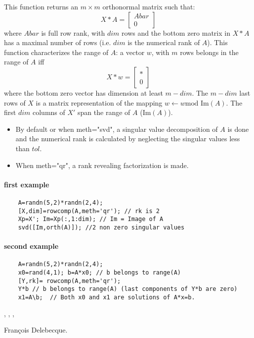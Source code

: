 \begin{mandescription}
This function returns an $m \times m$ orthonormal matrix such that:
$$
  X*A  = \left[ \begin{array}{c} Abar \\ 0 \end{array} \right] 
$$
where $Abar$ is full row rank, with $dim$ rows and the bottom zero matrix
in $X*A$ has a maximal number of rows (i.e. $dim$ is the numerical rank of $A$).
This function characterizes the range of $A$: a vector $w$, with $m$ rows
belongs in the range of $A$ iff 
$$
X*w  = \left[ \begin{array}{c} \ast \\ 0 \end{array} \right]
$$
where the bottom zero vector has dimension at least $m-dim$.
The $m-dim$ last rows of $X$ is a matrix representation of the mapping
$w \leftarrow w \text{mod Im} (A)$. 
The first $dim$ columns of $X'$ span the range of $A$ ($\text{Im}(A)$).
\begin{itemize}
\item By default or when  meth="svd", a singular value decomposition 
of $A$ is done and the numerical rank is calculated by 
neglecting the singular values less than $tol$.
\item When  meth="qr", a rank revealing factorization is made.
\end{itemize}
\end{mandescription}

\begin{examples}
\paragraph{first example}
  \begin{Verbatim}
    A=randn(5,2)*randn(2,4);
    [X,dim]=rowcomp(A,meth='qr'); // rk is 2 
    Xp=X'; Im=Xp(:,1:dim); // Im = Image of A 
    svd([Im,orth(A)]); //2 non zero singular values
  \end{Verbatim}
\paragraph{second example}
  \begin{Verbatim}
    A=randn(5,2)*randn(2,4);
    x0=rand(4,1); b=A*x0; // b belongs to range(A)  
    [Y,rk]= rowcomp(A,meth='qr');
    Y*b // b belongs to range(A) (last components of Y*b are zero)   
    x1=A\b;  // Both x0 and x1 are solutions of A*x=b.
  \end{Verbatim}
\end{examples}

\begin{manseealso}
  , , , 
\end{manseealso}

\begin{authors}
  Fran\c{c}ois Delebecque.
\end{authors}

